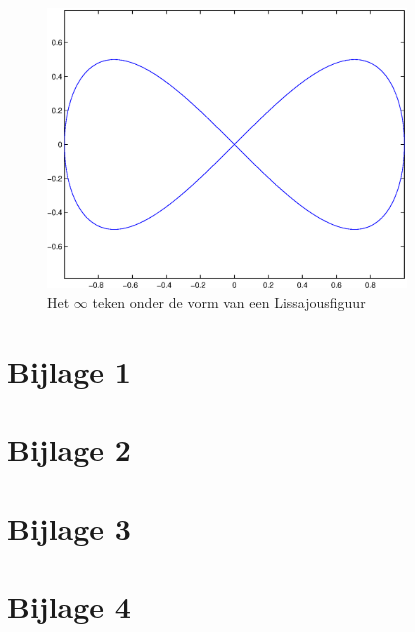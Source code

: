 \documentclass[a4paper]{article}
\begin{document}
\begin{figure}
        \centering
        \includegraphics[width=0.85\textwidth]{lissajous.eps}
        \caption{Het $\infty$ teken onder de vorm van een Lissajousfiguur}
        \label{fig:lissajous}
    \end{figure}
\newpage
\section*{Bijlage 1} 

\label{bijlage:1}
\section*{Bijlage 2} 

\label{bijlage:2}
\section*{Bijlage 3} 

\label{bijlage:3}
\section*{Bijlage 4} 

\label{bijlage:4}
\end{document}
